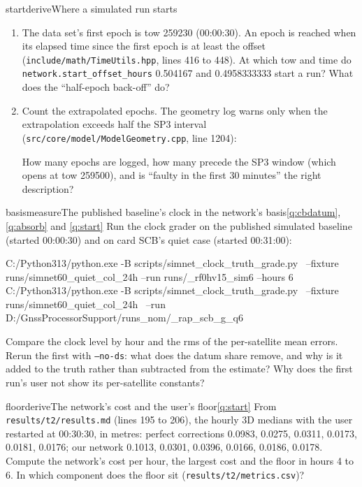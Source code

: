 \begin{question}{start}{derive}{Where a simulated run starts}{}
\begin{enumerate}[leftmargin=*, itemsep=1pt]
\item The data set's first epoch is tow 259230 (00:00:30). An epoch is reached when
      its elapsed time since the first epoch is at least the offset
      (\texttt{include/math/TimeUtils.hpp}, lines 416 to 448). At which tow and
      time do \texttt{network.start\_offset\_hours} 0.504167 and 0.4958333333 start
      a run? What does the ``half-epoch back-off'' do?
\item Count the extrapolated epochs. The geometry log warns only when the
      extrapolation exceeds half the SP3 interval
      (\texttt{src/core/model/ModelGeometry.cpp}, line 1204):
      How many epochs are logged, how many precede the SP3 window (which opens at
      tow 259500), and is ``faulty in the first 30 minutes'' the right description?
\end{enumerate}
\end{question}

\begin{question}{basis}{measure}{The published baseline's clock in the network's basis}{\ref{q:cbdatum}, \ref{q:absorb} and \ref{q:start}}
Run the clock grader on the published simulated baseline (started 00:00:30) and on
card SCB's quiet case (started 00:31:00):
\begin{cmd}
C:/Python313/python.exe -B scripts/simnet_clock_truth_grade.py \
    --fixture runs/simnet60_quiet_col_24h --run runs/_rf0hv15_sim6 --hours 6
C:/Python313/python.exe -B scripts/simnet_clock_truth_grade.py \
    --fixture runs/simnet60_quiet_col_24h \
    --run D:/GnssProcessorSupport/runs_nom/_rap_scb_g_q6
\end{cmd}
Compare the clock level by hour and the rms of the per-satellite mean errors.
Rerun the first with \texttt{--no-ds}: what does the datum share remove, and why
is it added to the truth rather than subtracted from the estimate? Why does the
first run's user not show its per-satellite constants?
\end{question}

\begin{question}{floor}{derive}{The network's cost and the user's floor}{\ref{q:start}}
From \texttt{results/t2/results.md} (lines 195 to 206), the hourly 3D medians with
the user restarted at 00:30:30, in metres: perfect corrections 0.0983, 0.0275,
0.0311, 0.0173, 0.0181, 0.0176; our network 0.1013, 0.0301, 0.0396, 0.0166, 0.0186,
0.0178. Compute the network's cost per hour, the largest cost and the floor in
hours 4 to 6. In which component does the floor sit (\texttt{results/t2/metrics.csv})?
\end{question}

